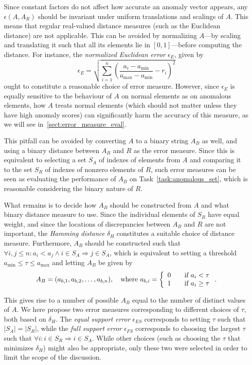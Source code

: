 Since constant factors do not affect how accurate an anomaly vector appears, any $\epsilon(A, A_R)$ should be invariant under uniform translations and scalings of $A$. This means that regular real-valued distance measures (such as the Euclidean distance) are not applicable. This can be avoided by normalizing $A$---by scaling and translating it such that all its elements lie in $[0,1]$---before computing the distance. For instance, the \emph{normalized Euclidean error} $\epsilon_E$, given by
\[
    \epsilon_E = \sqrt{\sum_{i=1}^n {(\frac{a_i-a_{\min}}{a_{\max}-a_{\min}} - r_i)}^2}
\]
ought to constitute a reasonable choice of error measure. However, since $\epsilon_E$ is equally sensitive to the behaviour of $A$ on normal elements as on anomalous elements, how $A$ treats normal elements (which should not matter unless they have high anomaly scores) can significantly harm the accuracy of this measure, as we will see in~\ref{sect:error_measure_eval}. 

This pitfall can be avoided by converting $A$ to a binary string $A_B$ as well, and using a binary distance between $A_B$ and $R$ as the error measure. Since this is equivalent to selecting a set $S_A$ of indexes of elements from $A$ and comparing it to the set $S_R$ of indexes of nonzero elements of $R$, such error measures can be seen as evaluating the performance of $A_B$ on Task~\ref{task:anomalous_set}, which is reasonable considering the binary nature of $R$.

What remains is to decide how $A_B$ should be constructed from $A$ and what binary distance measure to use. Since the individual elements of $S_R$ have equal weight, and since the locations of discrepancies between $A_B$ and $R$ are not important, the \emph{Hamming distance} $\delta_H$ constitutes a suitable choice of distance measure. Furthermore, $A_B$ should be constructed such that $\forall i, j \leq n: a_i < a_j \wedge i \in S_A \Rightarrow j \in S_A$, which is equivalent to setting a threshold $a_{\min} \leq \tau \leq a_{\max}$ and letting $A_B$ be given by 
\[
    A_B = (a_{b,1}, a_{b,2}, \dots, a_{b,n}), \quad \text{where } a_{b,i} = \left\{ 
    \begin{array}{l l}
        0 & \quad \text{if } a_i < \tau \\
        1 & \quad \text{if } a_i \geq \tau
    \end{array} \right..
\]

This gives rise to a number of possible $A_B$ equal to the number of distinct values of $A$. We here propose two error measures corresponding to different choices of $\tau$, both based on $\delta_H$. The \emph{equal support error} $\epsilon_{ES}$ corresponds to setting $\tau$ such that $|S_A| = |S_R|$, while the \emph{full support error} $\epsilon_{FS}$ corresponds to choosing the largest $\tau$ such that $\forall i: i \in S_R \Rightarrow i \in S_A$. While other choices (such as choosing the $\tau$ that minimizes $\delta_H$) might also be appropriate, only these two were selected in order to limit the scope of the discussion.


